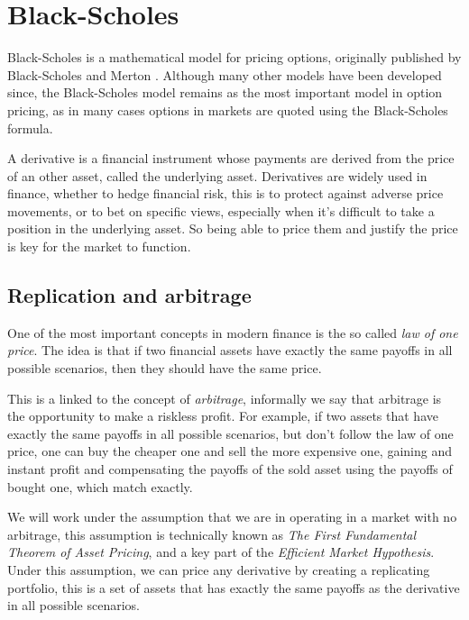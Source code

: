 
\chapter{Black-Scholes}\label{ch:bs}

Black-Scholes is a mathematical model for pricing options,
originally published by Black-Scholes \cite{Black1973} and Merton \cite{Merton1973}.
Although many other models have been developed since,
the Black-Scholes model remains as the most important model in option pricing,
as in many cases options in markets are quoted using the Black-Scholes formula.

A derivative is a financial instrument whose payments are derived from the price of an other asset, called the underlying asset.
Derivatives are widely used in finance,
whether to hedge financial risk, this is to protect against adverse price movements,
or to bet on specific views, especially when it's difficult to take a position in the underlying asset.
So being able to price them and justify the price is key for the market to function.

\section{Replication and arbitrage}

One of the most important concepts in modern finance is the so called \textit{law of one price}.
The idea is that if two financial assets have exactly the same payoffs in all possible scenarios,
then they should have the same price.

This is a linked to the concept of \textit{arbitrage},
informally we say that arbitrage is the opportunity to make a riskless profit.
For example, if two assets that have exactly the same payoffs in all possible scenarios,
but don't follow the law of one price,
one can buy the cheaper one and sell the more expensive one,
gaining and instant profit and compensating the payoffs of the sold asset using the payoffs of bought one,
which match exactly.

We will work under the assumption that we are in operating in a market with no arbitrage,
this assumption is technically known as \textit{The First Fundamental Theorem of Asset Pricing},
and a key part of the \textit{Efficient Market Hypothesis}.
Under this assumption, we can price any derivative by creating a replicating portfolio,
this is a set of assets that has exactly the same payoffs as the derivative in all possible scenarios.

